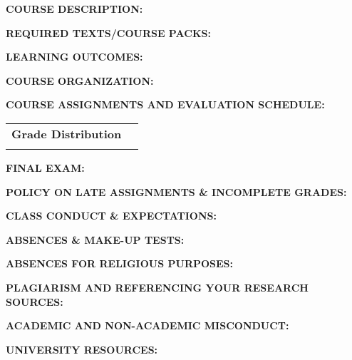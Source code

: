 \documentclass[10pt]{article}
\begin{document}
\textbf{COURSE DESCRIPTION:}\\
\CourseDesc

\textbf{REQUIRED TEXTS/COURSE PACKS:}\\
\TextBook

\textbf{LEARNING OUTCOMES:}\\
\LearnOut

\textbf{COURSE ORGANIZATION:}\\
\CourseOrg

\textbf{COURSE ASSIGNMENTS AND EVALUATION SCHEDULE:}
\begin{flushleft}
	\begin{tabular}{c c}
		\textbf{Grade Distribution} \\
		\GradeDist
	\end{tabular}
\end{flushleft}
\CourseAss

\textbf{FINAL EXAM:} \\
\FinalExam

\textbf{POLICY ON LATE ASSIGNMENTS \& INCOMPLETE GRADES:}\\
\LatePolicy

\textbf{CLASS CONDUCT \& EXPECTATIONS:}\\
\ClassConduct

\textbf{ABSENCES \& MAKE-UP TESTS:}\\
\Absences

\textbf{ABSENCES FOR RELIGIOUS PURPOSES:}\\
\Religious

\textbf{PLAGIARISM AND REFERENCING YOUR RESEARCH SOURCES:}\\
\Plagiarism

\textbf{ACADEMIC AND NON-ACADEMIC MISCONDUCT:}\\
\AcaHon

\textbf{UNIVERSITY RESOURCES:}\\
\UniRes


\end{document}
